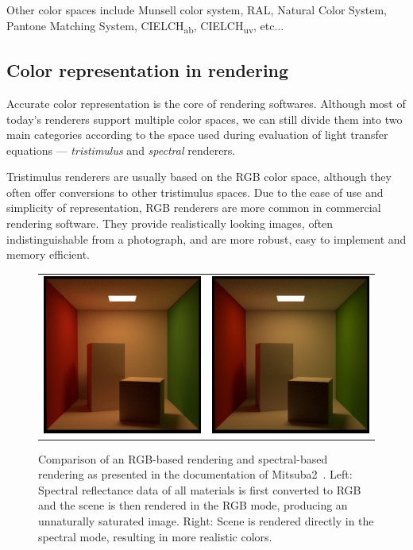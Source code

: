 Other color spaces include Munsell color system, RAL, Natural Color System, Pantone Matching System, CIELCH\textsubscript{ab}, CIELCH\textsubscript{uv}, etc$\ldots$

\subsection{Color representation in rendering}

Accurate color representation is the core of rendering softwares. Although most of today's renderers support multiple color spaces, we can still divide them into two main categories according to the space used during evaluation of light transfer equations --- \emph{tristimulus} and \emph{spectral} renderers.

Tristimulus renderers are usually based on the RGB color space, although they often offer conversions to other tristimulus spaces. Due to the ease of use and simplicity of representation, RGB renderers are more common in commercial rendering software. They provide realistically looking images, often indistinguishable from a photograph, and are more robust, easy to implement and memory efficient.

\begin{figure}[t]
	\centering
	{\sffamily
		\begin{tabular}{cc}
			\includegraphics[width=0.45\linewidth]{img/mitsuba_rgb_mode.jpg}
			&
			\includegraphics[width=0.45\linewidth]{img/mitsuba_spectral_mode.jpg}\\
		\end{tabular}
	}
	\caption{Comparison of an RGB-based rendering and spectral-based rendering as presented in the documentation of Mitsuba2~\cite{Mitsuba2}. Left: Spectral reflectance data of all materials is first converted to RGB and the scene is then rendered in the RGB mode, producing an unnaturally saturated image. Right: Scene is rendered directly in the spectral mode, resulting in more realistic colors. }
	\label{fig:mitsubaRGBSpectralComparison}
\end{figure}

